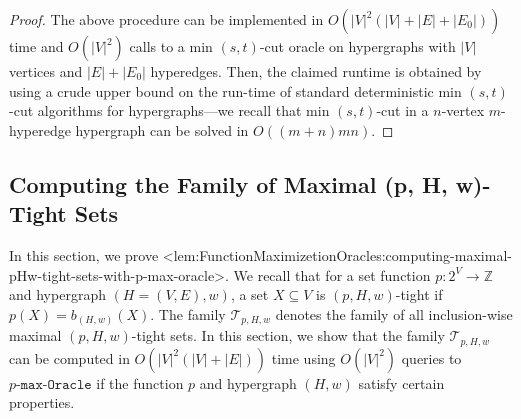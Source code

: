 \documentclass{article}
\def\Cref#1{<#1>}%
\def\({}
\def\){}
\newcommand{\functionMaximizationEmptyOracle}[1]
{\ensuremath{{#1}\text{-}\mathtt{max}\text{-}\mathtt{Oracle}}\xspace}
\newcommand{\maximalTightSetFamily}[1]{\ensuremath{\calT_{#1}}\xspace}
\providecommand{\Z}{\mathbb{Z}}
\providecommand{\calT}{\mathcal{T}}
\begin{document}
\begin{proof}
    The above procedure can be implemented in $O(|V|^2(|V| + |E| + |E_0|))$ time and $O(|V|^2)$ calls to a min $(s,t)$-cut oracle on hypergraphs with $|V|$ vertices and $|E| + |E_0|$ hyperedges. Then, the claimed runtime is obtained by using a crude upper bound on the run-time of standard deterministic min $(s,t)$-cut algorithms for hypergraphs---we recall that min $(s,t)$-cut in a $n$-vertex $m$-hyperedge hypergraph can be solved in $O((m+n)mn)$.
\end{proof}


\subsection{Computing the Family of Maximal \((p, H, w)\)-Tight Sets}\label{appendix:sec:Function-Maximization-Oracles:computing-maximal-pHw-tight-sets-family}
In this section, we prove \Cref{lem:FunctionMaximizetionOracles:computing-maximal-pHw-tight-sets-with-p-max-oracle}. 
We recall that for a set function $p:2^V\rightarrow\Z$ and hypergraph $(H = (V, E), w)$, a set $X\subseteq V$ is $(p, H, w)$-tight if $p(X) = b_{(H,w)}(X)$. The family $\maximalTightSetFamily{p, H, w}$ denotes the family of all inclusion-wise maximal $(p, H, w)$-tight sets. In this section, we show that the family $\maximalTightSetFamily{p, H, w}$ can be computed in $O(|V|^2(|V| + |E|))$ time using $O(|V|^2)$ queries to \functionMaximizationEmptyOracle{p} if the function $p$ and hypergraph $(H, w)$ satisfy certain properties.
\end{document}
